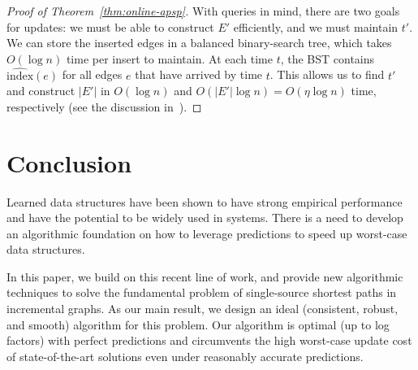 \documentclass[11pt]{article}
\newcommand{\ind}{\text{index}}
\begin{document}
\begin{proof}[Proof of  Theorem~\ref{thm:online-apsp}]
With queries in mind, there are two goals for updates: we must be able to construct $E'$ efficiently, and we must maintain $t'$. 
We can store the inserted edges in a balanced binary-search tree, which takes $O(\log n)$ time per insert to maintain. At each time $t$, the BST contains $\widehat{\ind}(e)$ for all edges $e$ that have arrived by time $t$. This allows us to find $t'$ and construct $|E'|$ in $O(\log n)$ and $O(|E'| \log n) = O(\eta \log n)$ time, respectively (see the discussion in~\cite[Theorem 3.1]{BrandFNP24}).
\end{proof} \section{Conclusion}

Learned data structures have been shown to have strong empirical performance and have the potential to be widely used in systems.  There is a need to develop an algorithmic foundation on how to leverage predictions to speed up worst-case data structures.  

In this paper, we build on this recent line of work, and provide new algorithmic techniques to solve the fundamental problem of
single-source shortest paths in incremental graphs.  As our main result, we design an ideal (consistent, robust, and smooth) algorithm for this problem.  
Our algorithm is optimal (up to log factors) with perfect predictions and circumvents the high worst-case update cost of state-of-the-art solutions even under reasonably accurate predictions.  


\end{document}
